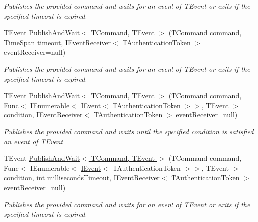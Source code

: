\begin{DoxyCompactItemize}
\begin{DoxyCompactList}\small\item\em Publishes the provided {\itshape command}  and waits for an event of {\itshape T\+Event}  or exits if the specified timeout is expired. \end{DoxyCompactList}\item 
T\+Event \hyperlink{classCqrs_1_1Akka_1_1Commands_1_1ConcurrentAkkaCommandPublisher_a53bb54045aabca54124659e56f8fcede_a53bb54045aabca54124659e56f8fcede}{Publish\+And\+Wait$<$ T\+Command, T\+Event $>$} (T\+Command command, Time\+Span timeout, \hyperlink{interfaceCqrs_1_1Events_1_1IEventReceiver}{I\+Event\+Receiver}$<$ T\+Authentication\+Token $>$ event\+Receiver=null)
\begin{DoxyCompactList}\small\item\em Publishes the provided {\itshape command}  and waits for an event of {\itshape T\+Event}  or exits if the specified timeout is expired. \end{DoxyCompactList}\item 
T\+Event \hyperlink{classCqrs_1_1Akka_1_1Commands_1_1ConcurrentAkkaCommandPublisher_a396d965b3c74f546923840a680539164_a396d965b3c74f546923840a680539164}{Publish\+And\+Wait$<$ T\+Command, T\+Event $>$} (T\+Command command, Func$<$ I\+Enumerable$<$ \hyperlink{interfaceCqrs_1_1Events_1_1IEvent}{I\+Event}$<$ T\+Authentication\+Token $>$$>$, T\+Event $>$ condition, \hyperlink{interfaceCqrs_1_1Events_1_1IEventReceiver}{I\+Event\+Receiver}$<$ T\+Authentication\+Token $>$ event\+Receiver=null)
\begin{DoxyCompactList}\small\item\em Publishes the provided {\itshape command}  and waits until the specified condition is satisfied an event of {\itshape T\+Event}  \end{DoxyCompactList}\item 
T\+Event \hyperlink{classCqrs_1_1Akka_1_1Commands_1_1ConcurrentAkkaCommandPublisher_a158c0f61847635a7e2b6be760f5927ee_a158c0f61847635a7e2b6be760f5927ee}{Publish\+And\+Wait$<$ T\+Command, T\+Event $>$} (T\+Command command, Func$<$ I\+Enumerable$<$ \hyperlink{interfaceCqrs_1_1Events_1_1IEvent}{I\+Event}$<$ T\+Authentication\+Token $>$$>$, T\+Event $>$ condition, int milliseconds\+Timeout, \hyperlink{interfaceCqrs_1_1Events_1_1IEventReceiver}{I\+Event\+Receiver}$<$ T\+Authentication\+Token $>$ event\+Receiver=null)
\begin{DoxyCompactList}\small\item\em Publishes the provided {\itshape command}  and waits for an event of {\itshape T\+Event}  or exits if the specified timeout is expired. \end{DoxyCompactList}\item 

\end{DoxyCompactItemize}
